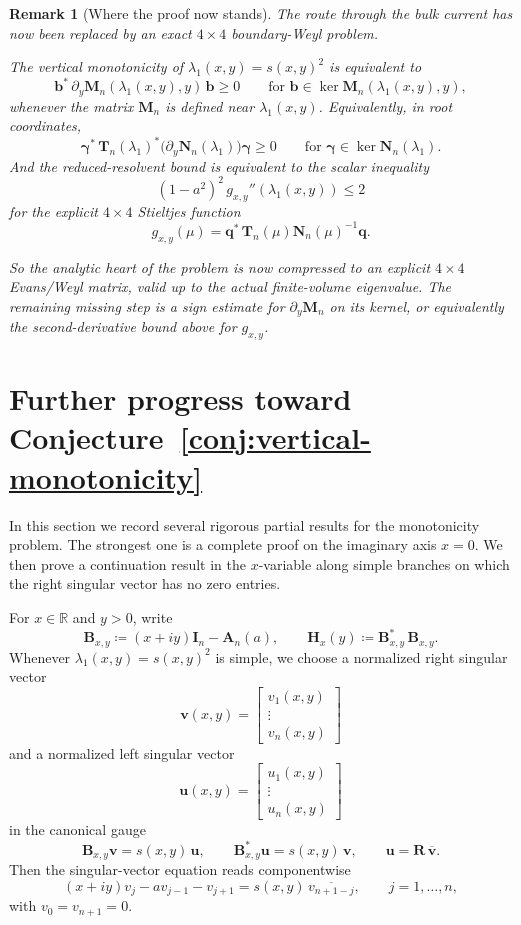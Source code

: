 \documentclass[11pt]{article}
\newtheorem{remark}[theorem]{Remark}
\begin{document}
\begin{remark}[Where the proof now stands]
The route through the bulk current has now been replaced by an exact \(4\times4\) boundary-Weyl problem.

\smallskip

\noindent
The vertical monotonicity of \(\lambda_1(x,y)=s(x,y)^2\) is equivalent to
\[
\mathbf b^*\,\partial_y\mathbf M_n(\lambda_1(x,y),y)\,\mathbf b\ge 0
\qquad
\text{for }\mathbf b\in\ker \mathbf M_n(\lambda_1(x,y),y),
\]
whenever the matrix \(\mathbf M_n\) is defined near \(\lambda_1(x,y)\). Equivalently, in root coordinates,
\[
\boldsymbol{\gamma}^*\,\mathbf T_n(\lambda_1)^*
\bigl(\partial_y\mathbf N_n(\lambda_1)\bigr)\boldsymbol{\gamma}\ge 0
\qquad
\text{for }\boldsymbol{\gamma}\in\ker \mathbf N_n(\lambda_1).
\]
And the reduced-resolvent bound is equivalent to the scalar inequality
\[
(1-a^2)^2\,g_{x,y}''(\lambda_1(x,y))\le 2
\]
for the explicit \(4\times4\) Stieltjes function
\[
g_{x,y}(\mu)=\mathbf q^*\,\mathbf T_n(\mu)\mathbf N_n(\mu)^{-1}\mathbf q.
\]

\smallskip

\noindent
So the analytic heart of the problem is now compressed to an explicit \(4\times4\) Evans/Weyl matrix, valid up to the actual finite-volume eigenvalue. The remaining missing step is a sign estimate for \(\partial_y\mathbf M_n\) on its kernel, or equivalently the second-derivative bound above for \(g_{x,y}\).
\end{remark}

\section{Further progress toward Conjecture~\ref{conj:vertical-monotonicity}}

In this section we record several rigorous partial results for the monotonicity problem. The strongest one is a complete proof on the imaginary axis \(x=0\). We then prove a continuation result in the \(x\)-variable along simple branches on which the right singular vector has no zero entries.

For \(x\in\mathbb R\) and \(y>0\), write
\[
\mathbf B_{x,y}\coloneqq (x+iy)\mathbf I_n-\mathbf A_n(a),
\qquad
\mathbf H_x(y)\coloneqq \mathbf B_{x,y}^*\,\mathbf B_{x,y}.
\]
Whenever \(\lambda_1(x,y)=s(x,y)^2\) is simple, we choose a normalized right singular vector
\[
\mathbf v(x,y)=
\begin{bmatrix}
v_1(x,y)\\
\vdots\\
v_n(x,y)
\end{bmatrix}
\]
and a normalized left singular vector
\[
\mathbf u(x,y)=
\begin{bmatrix}
u_1(x,y)\\
\vdots\\
u_n(x,y)
\end{bmatrix}
\]
in the canonical gauge
\[
\mathbf B_{x,y}\mathbf v=s(x,y)\,\mathbf u,
\qquad
\mathbf B_{x,y}^*\mathbf u=s(x,y)\,\mathbf v,
\qquad
\mathbf u=\mathbf R\,\overline{\mathbf v}.
\]
Then the singular-vector equation reads componentwise
\[
(x+iy)v_j-a v_{j-1}-v_{j+1}=s(x,y)\,\overline{v_{n+1-j}},
\qquad
j=1,\dots,n,
\]
with \(v_0=v_{n+1}=0\).
\end{document}
